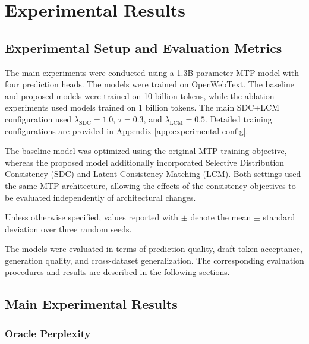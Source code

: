 
\chapter{Experimental Results}\label{chap:experimental_results}

\section{Experimental Setup and Evaluation Metrics}\label{sec:4-setup}

The main experiments were conducted using a 1.3B-parameter MTP model
with four prediction heads. The models were trained on
OpenWebText\cite{gokaslan2019openwebtext}. The baseline and proposed
models were trained on 10 billion tokens, while the ablation experiments
used models trained on 1 billion tokens. The main SDC+LCM configuration
used $\lambda_{\mathrm{SDC}}=1.0$, $\tau=0.3$, and
$\lambda_{\mathrm{LCM}}=0.5$. Detailed training configurations are
provided in Appendix \ref{app:experimental-config}.

The baseline model was optimized using the original MTP training objective,
whereas the proposed model additionally incorporated Selective Distribution
Consistency (SDC) and Latent Consistency Matching (LCM). Both settings used
the same MTP architecture, allowing the effects of the consistency objectives
to be evaluated independently of architectural changes.

Unless otherwise specified, values reported with $\pm$ denote the
mean $\pm$ standard deviation over three random seeds.

The models were evaluated in terms of prediction quality, draft-token
acceptance, generation quality, and cross-dataset generalization.
The corresponding evaluation procedures and results are described
in the following sections.

\section{Main Experimental Results}\label{sec:4-main_results}

\subsection{Oracle Perplexity}


